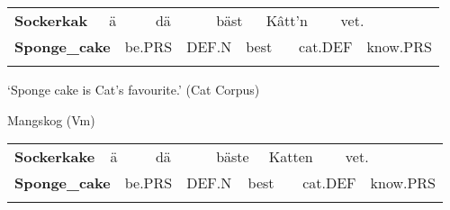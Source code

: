 \begin{tabular}{llllllllllll}
\lsptoprule
{\bfseries Sockerkak} & \multicolumn{2}{l}{ä

} & \multicolumn{2}{l}{dä

} & \multicolumn{2}{l}{bäst

} & \multicolumn{2}{l}{Kâtt’n

} & \multicolumn{2}{l}{vet.

} & \\
\multicolumn{2}{l}{{\bfseries Sponge\_cake}

} & \multicolumn{2}{l}{be.PRS

} & \multicolumn{2}{l}{DEF.N

} & \multicolumn{2}{l}{best

} & \multicolumn{2}{l}{cat.DEF

} & \multicolumn{2}{l}{know.PRS

}\\
\lspbottomrule
\end{tabular}

\begin{styleTranslation}
‘Sponge cake is Cat’s favourite.’ (Cat Corpus)

\end{styleTranslation}

\begin{styleExLtrTblii}
Mangskog (Vm) 

\end{styleExLtrTblii}

\begin{tabular}{llllllllllll}
\lsptoprule
{\bfseries Sockerkake} & \multicolumn{2}{l}{ä

} & \multicolumn{2}{l}{dä

} & \multicolumn{2}{l}{bäste

} & \multicolumn{2}{l}{Katten

} & \multicolumn{2}{l}{vet.

} & \\
\multicolumn{2}{l}{{\bfseries Sponge\_cake}

} & \multicolumn{2}{l}{be.PRS

} & \multicolumn{2}{l}{DEF.N

} & \multicolumn{2}{l}{best

} & \multicolumn{2}{l}{cat.DEF

} & \multicolumn{2}{l}{know.PRS

}\\
\lspbottomrule
\end{tabular}

